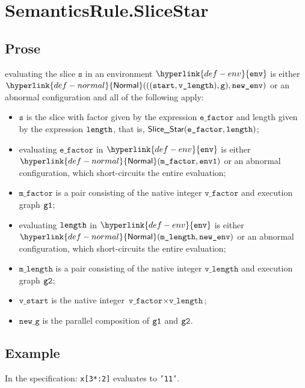\documentclass{book}
\newcommand\ProseOrAbnormal[0]{or an abnormal configuration, which short-circuits the entire evaluation}
\newcommand\Normal[0]{\hyperlink{def-normal}{\textsf{Normal}}}
\newcommand\env[0]{\hyperlink{def-env}{\texttt{env}}}
\newcommand\vg[0]{\texttt{g}}
\newcommand\newg[0]{\texttt{new\_g}}
\newcommand\vs[0]{\texttt{s}}
\newcommand\start[0]{\texttt{start}}
\newcommand\vstart[0]{\texttt{v\_start}}
\newcommand\mlength[0]{\texttt{m\_length}}
\newcommand\vlength[0]{\texttt{v\_length}}
\newcommand\efactor[0]{\texttt{e\_factor}}
\newcommand\mfactor[0]{\texttt{m\_factor}}
\newcommand\vfactor[0]{\texttt{v\_factor}}
\begin{document}

\section{SemanticsRule.SliceStar \label{sec:SemanticsRule.SliceStar}}
  \subsection{Prose}
  evaluating the slice $\vs$ in an environment $\env$ is either \\
  $\Normal(((\start, \vlength), \vg), \newenv)$
  or an abnormal configuration and all of the following apply:
  \begin{itemize}
    \item $\vs$ is the slice with factor given by the
      expression $\efactor$ and length given by the
      expression $\texttt{length}$, that is, $\SliceStar(\efactor, \elength)$;
    \item evaluating $\efactor$ in $\env$ is either $\Normal(\mfactor, \envone)$ \ProseOrAbnormal;
    \item $\mfactor$ is a pair consisting of the native integer $\vfactor$ and execution graph $\texttt{g1}$;
    \item evaluating $\texttt{length}$ in $\env$ is either $\Normal(\mlength, \newenv)$ \ProseOrAbnormal;
    \item $\mlength$ is a pair consisting of the native integer $\vlength$ and execution graph $\texttt{g2}$;
    \item $\vstart$ is the native integer $\vfactor \times \vlength$;
   \item $\newg$ is the parallel composition of $\texttt{g1}$ and $\texttt{g2}$.
   \end{itemize}


  \subsection{Example}
  In the specification:
  \texttt{x[3*:2]} evaluates to \texttt{'11'}.


\end{document}
